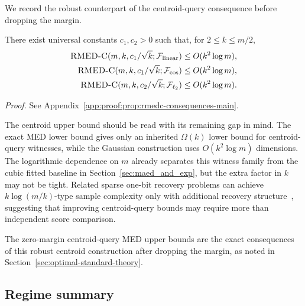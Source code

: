 \documentclass{article}
\begin{document}
We record the robust counterpart of the centroid-query consequence before dropping the margin.
\begin{proposition}\label{prop:rmedc-consequences-main}
There exist universal constants $c_1,c_2>0$ such that, for $2\leq k\leq m/2$,
\begin{align*}
    \textsc{RMED-C}(m,k,c_1/\sqrt{k};\mathcal{F}_{\rm linear})&\leq O(k^2\log m),\\
    \textsc{RMED-C}(m,k,c_1/\sqrt{k};\mathcal{F}_{\cos})&\leq O(k^2\log m),\\
    \textsc{RMED-C}(m,k,c_2/\sqrt{k};\mathcal{F}_{\ell_{2}})&\leq O(k^2\log m).
\end{align*}
\end{proposition}
\noindent\textit{Proof.} See Appendix~\ref{app:proof:prop:rmedc-consequences-main}.

The centroid upper bound should be read with its remaining gap in mind.
The exact MED lower bound gives only an inherited $\Omega(k)$ lower
bound for centroid-query witnesses, while the Gaussian construction
uses $O(k^2\log m)$ dimensions. The logarithmic dependence on $m$
already separates this witness family from the cubic fitted baseline in
Section~\ref{sec:maed_and_exp}, but the extra factor in $k$ may not be
tight. Related sparse one-bit recovery problems can achieve
$k\log(m/k)$-type sample complexity only with additional recovery
structure~\citep{aksoylar2014information}, suggesting that improving
centroid-query bounds may require more than independent score
comparison.

The zero-margin centroid-query MED upper bounds are the exact consequences of this robust centroid construction after dropping the margin, as noted in Section~\ref{sec:optimal-standard-theory}.

\subsection{Regime summary}
\end{document}
